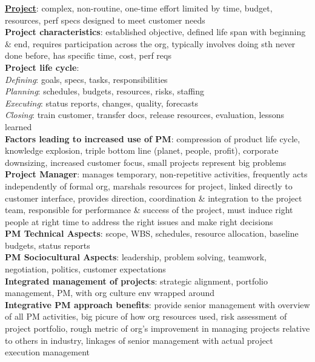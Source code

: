 \documentclass[a4paper]{article}
\begin{document}
    \begin{multicols}{3}
        \tiny
        \noindent\underline{\textbf{Project}}: complex, non-routine, one-time effort limited by time, budget, resources, perf specs designed to meet customer needs\\
        \textbf{Project characteristics}: established objective, defined life span with beginning \& end, requires participation across the org, typically involves doing sth never done before, has specific time, cost, perf reqs\\
        \textbf{Project life cycle}:\\
        \textit{Defining}: goals, specs, tasks, responsibilities\\
        \textit{Planning}: schedules, budgets, resources, risks, staffing\\
        \textit{Executing}: status reports, changes, quality, forecasts\\
        \textit{Closing}: train customer, transfer docs, release resources, evaluation, lessons learned\\
        \textbf{Factors leading to increased use of PM}: compression of product life cycle, knowledge explosion, triple bottom line (planet, people, profit), corporate downsizing, increased customer focus, small projects represent big problems\\
        \textbf{Project Manager}: manages temporary, non-repetitive activities, frequently acts independently of formal org, marshals resources for project, linked directly to customer interface, provides direction, coordination \& integration to the project team, responsible for performance \& success of the project, must induce right people at right time to address the right issues and make right decisions\\
        \textbf{PM Technical Aspects}: scope, WBS, schedules, resource allocation, baseline budgets, status reports\\
        \textbf{PM Sociocultural Aspects}: leadership, problem solving, teamwork, negotiation, politics, customer expectations\\
        \textbf{Integrated management of projects}: strategic alignment, portfolio management, PM, with org culture env wrapped around\\
        \textbf{Integrative PM approach benefits}: provide senior management with overview of all PM activities, big picure of how org resources used, risk assessment of project portfolio, rough metric of org's improvement in managing projects relative to others in industry, linkages of senior management with actual project execution management\\

\end{multicols}
\end{document}
